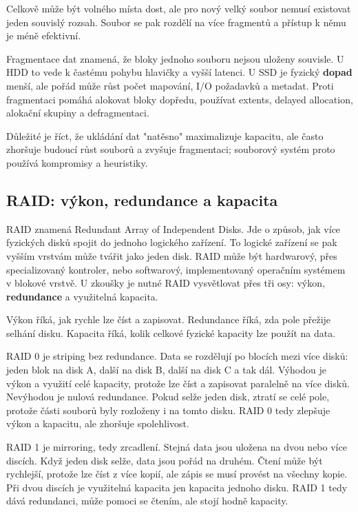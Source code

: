 \documentclass[11pt,a4paper]{article}
\begin{document}
Celkově může být volného místa dost, ale pro nový velký soubor nemusí existovat jeden souvislý rozsah. Soubor se pak rozdělí na více fragmentů a přístup k němu je méně efektivní.

Fragmentace dat znamená, že bloky jednoho souboru nejsou uloženy souvisle. U HDD to vede k častému pohybu hlavičky a vyšší latenci. U SSD je fyzický \textbf{dopad} menší, ale pořád může růst počet mapování, I/O požadavků a metadat. Proti fragmentaci pomáhá alokovat bloky dopředu, používat extents, delayed allocation, alokační skupiny a defragmentaci.

Důležité je říct, že ukládání dat "natěsno" maximalizuje kapacitu, ale často zhoršuje budoucí růst souborů a zvyšuje fragmentaci; souborový systém proto používá kompromisy a heuristiky.

\subsection*{RAID: výkon, redundance a kapacita}

RAID znamená Redundant Array of Independent Disks. Jde o způsob, jak více fyzických disků spojit do jednoho logického zařízení. To logické zařízení se pak vyšším vrstvám může tvářit jako jeden disk. RAID může být hardwarový, přes specializovaný kontroler, nebo softwarový, implementovaný operačním systémem v blokové vrstvě. U zkoušky je nutné RAID vysvětlovat přes tři osy: výkon, \textbf{redundance} a využitelná kapacita.

Výkon říká, jak rychle lze číst a zapisovat. Redundance říká, zda pole přežije selhání disku. Kapacita říká, kolik celkové fyzické kapacity lze použít na data.

RAID 0 je striping bez redundance. Data se rozdělují po blocích mezi více disků: jeden blok na disk A, další na disk B, další na disk C a tak dál. Výhodou je výkon a využití celé kapacity, protože lze číst a zapisovat paralelně na více disků. Nevýhodou je nulová redundance. Pokud selže jeden disk, ztratí se celé pole, protože části souborů byly rozloženy i na tomto disku. RAID 0 tedy zlepšuje výkon a kapacitu, ale zhoršuje spolehlivost.

RAID 1 je mirroring, tedy zrcadlení. Stejná data jsou uložena na dvou nebo více discích. Když jeden disk selže, data jsou pořád na druhém. Čtení může být rychlejší, protože lze číst z více kopií, ale zápis se musí provést na všechny kopie. Při dvou discích je využitelná kapacita jen kapacita jednoho disku. RAID 1 tedy dává redundanci, může pomoci se čtením, ale stojí hodně kapacity.
\end{document}
